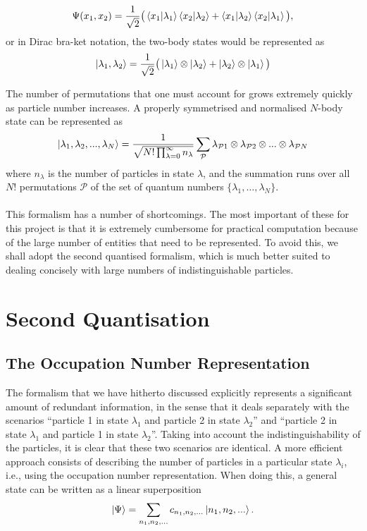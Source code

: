 \documentclass[a4paper,10pt]{article}
\begin{document}
\begin{equation}
 \Psi(x_1,x_2)=\frac{1}{\sqrt{2}}\big(\braket{x_1|\lambda_1}\braket{x_2|\lambda_2}+\braket{x_1|\lambda_2}\braket{x_2|\lambda_1}\big),
\end{equation}
or in Dirac bra-ket notation, the two-body states would be represented as
\begin{equation}
 \ket{\lambda_1,\lambda_2}=\frac{1}{\sqrt{2}}\big(\ket{\lambda_1}\otimes \ket{\lambda_2}+\ket{\lambda_2}\otimes\ket{\lambda_1}\big)
\end{equation}

The number of permutations that one must account for grows extremely quickly as particle number increases. A properly symmetrised and normalised $N$-body state can be
represented as 
\begin{equation}
 \ket{\lambda_1,\lambda_2,...,\lambda_N}=\frac{1}{\sqrt{N!\prod_{\lambda=0}^{\infty}{n_{\lambda}}}}\sum_{\mathcal{P}}\lambda_{\mathcal{P}1}\otimes\lambda_{\mathcal{P}2}\otimes...\otimes\lambda_{\mathcal{P}N}
\end{equation}
where $n_{\lambda}$ is the number of particles in state $\lambda$, and the summation runs over all $N!$ permutations $\mathscr{P}$ of the set of quantum numbers $\{ \lambda_1,\dots,\lambda_N\}$.
\\\\
This formalism has a number of shortcomings. The most important of these for this project is that it is extremely cumbersome for practical computation because of the large number of entities that need to be 
represented. To avoid this, we shall adopt the second quantised formalism, which is much better suited to dealing concisely with large numbers of indistinguishable particles.

\section{Second Quantisation}
\subsection{The Occupation Number Representation}
The formalism that we have hitherto discussed explicitly represents a significant amount of redundant information, in the sense that it deals separately with the scenarios ``particle 1 in state $\lambda_1$ and 
particle 2 in state $\lambda_2$'' and ``particle 2 in state $\lambda_1$ and particle 1 in state $\lambda_2$''. Taking into account the indistinguishability of the particles, it is clear that these two scenarios
are identical. A more efficient approach consists of describing the number of particles in a particular state $\lambda_i$, i.e., using the occupation number representation. When doing this, a general 
state can be written as a linear superposition
\begin{equation}
 \ket{\Psi}=\sum_{n_1,n_2,...}c_{n_1,n_2,...}\ket{n_1,n_2,...}.
\end{equation}
\end{document}
